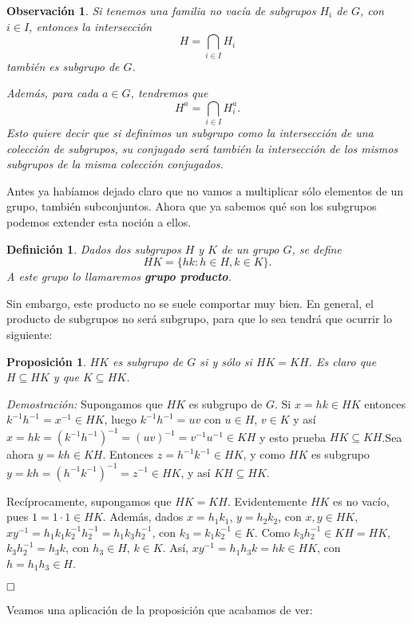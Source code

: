 \documentclass[12pt]{article}
\newtheorem{proposition}[theorem]{Proposición}
\newtheorem{definition}[theorem]{Definición}
\newtheorem{observation}{Observación}[theorem]
\begin{document}
\begin{observation} Si tenemos una familia no vacía de subgrupos $H_{i}$ de $G$, con $i \in I$, entonces la intersección $$H = \bigcap_{i \in I} H_{i}$$ también es subgrupo de $G$.

Además, para cada $a \in G$, tendremos que $$H^{a} = \bigcap_{i \in I}H_{i}^{a}.$$ Esto quiere decir que si definimos un subgrupo como la intersección de una colección de subgrupos, su conjugado será también la intersección de los mismos subgrupos de la misma colección conjugados.
\end{observation}

Antes ya habíamos dejado claro que no vamos a multiplicar sólo elementos de un grupo, también subconjuntos. Ahora que ya sabemos qué son los subgrupos podemos extender esta noción a ellos.
\begin{definition} Dados dos subgrupos $H$ y $K$ de un grupo $G$, se define $$HK = \lbrace hk : h \in H, k \in K \rbrace.$$ A este grupo lo llamaremos \textbf{grupo producto}.
\end{definition}

Sin embargo, este producto no se suele comportar muy bien. En general, el producto de subgrupos no será subgrupo, para que lo sea tendrá que ocurrir lo siguiente:

\begin{proposition} $HK$ es subgrupo de $G$ si y sólo si $HK = KH$. Es claro que $H \subseteq HK$ y que $K \subseteq HK$.
\end{proposition}
\emph{Demostración: } Supongamos que $HK$ es subgrupo de $G$. Si $x = hk \in HK$ entonces $k^{-1}h^{-1} = x^{-1} \in HK$, luego $k^{-1}h^{-1} = uv$ con $u \in H$, $v \in K$ y así $x = hk = (k^{-1}h^{-1})^{-1} = (uv)^{-1} = v^{-1}u^{-1} \in KH$ y esto prueba $HK \subseteq KH$.Sea ahora $y = kh \in KH$. Entonces $z = h^{-1}k^{-1} \in HK$, y como $HK$ es subgrupo $y = kh = (h^{-1}k^{-1})^{-1} = z^{-1} \in HK$, y así $KH \subseteq HK$.
 
Recíprocamente, supongamos que $HK = KH$. Evidentemente $HK$ es no vacío, pues $1 = 1 \cdot 1 \in HK$. Además, dados $x = h_{1}k_{1}$, $y = h_{2}k_{2}$, con $x,y \in HK$,$xy^{-1} = h_{1}k_{1}k_{2}^{-1}h_{2}^{-1} = h_{1}k_{3}h_{2}^{-1}$, con $k_{3} = k_{1}k_{2}^{-1} \in K$. Como $k_{3}h_{2}^{-1} \in KH = HK$, $k_{3}h_{2}^{-1} = h_{3}k$, con $h_{3} \in H$, $k \in K$. Así, $xy^{-1} = h_{1}h_{3}k = hk \in HK$, con $h = h_{1}h_{3} \in H$.

$\hfill \square$

Veamos una aplicación de la proposición que acabamos de ver:
\end{document}

